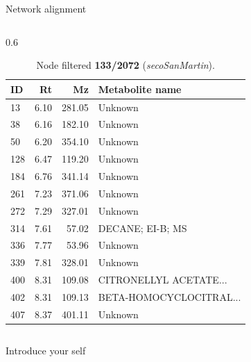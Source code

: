 \documentclass[aspectratio=169]{beamer}
\begin{document}
\begin{frame}{Network alignment}
\begin{columns}[t]
            \begin{column}{0.6\textwidth}
                \begin{table}[htp!]
                    \scriptsize
                    \centering
                    \caption{Node filtered \textbf{133/2072} (\textit{secoSanMartin}).}
                    \begin{tabular}{lrrl}\toprule
                        ID & Rt & Mz & Metabolite name \\\midrule
                        13 & 6.10 & 281.05 & Unknown \\
                        38 & 6.16 & 182.10 & Unknown \\
                        50 & 6.20 & 354.10 & Unknown \\
                        128 & 6.47 & 119.20 & Unknown \\
                        184 & 6.76 & 341.14 & Unknown \\
                        261 & 7.23 & 371.06 & Unknown \\
                        272 & 7.29 & 327.01 & Unknown \\
                        314 & 7.61 & 57.02 & DECANE; EI-B; MS \\
                        336 & 7.77 & 53.96 & Unknown \\
                        339 & 7.81 & 328.01 & Unknown \\
                        400 & 8.31 & 109.08 & CITRONELLYL ACETATE... \\ %
                        402 & 8.31 & 109.13 & BETA-HOMOCYCLOCITRAL... \\ %
                        407 & 8.37 & 401.11 & Unknown \\\bottomrule
                    \end{tabular}
                \end{table}
            \end{column}
        \end{columns}

        \begin{note}
            {Introduce your self}
        \end{note}
    \end{frame}

\end{document}
